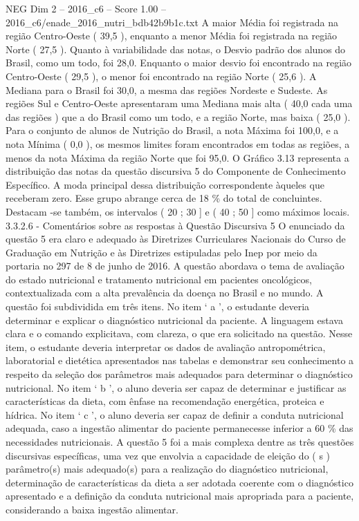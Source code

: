\begin{textsample}{NEG Dim 2 – 2016\_c6 – Score 1.00 – 2016\_c6/enade\_2016\_nutri\_bdb42b9b1c.txt}
A maior Média foi registrada na região Centro-Oeste ( 39,5 ), enquanto a menor Média foi registrada na região Norte ( 27,5 ).
Quanto à variabilidade das notas, o Desvio padrão dos alunos do Brasil, como um todo, foi 28,0.
Enquanto o maior desvio foi encontrado na região Centro-Oeste ( 29,5 ), o menor foi encontrado na região Norte ( 25,6 ).
A Mediana para o Brasil foi 30,0, a mesma das regiões Nordeste e Sudeste.
As regiões Sul e Centro-Oeste apresentaram uma Mediana mais alta ( 40,0 cada uma das regiões ) que a do Brasil como um todo, e a região Norte, mas baixa ( 25,0 ).
Para o conjunto de alunos de Nutrição do Brasil, a nota Máxima foi 100,0, e a nota Mínima ( 0,0 ), os mesmos limites foram encontrados em todas as regiões, a menos da nota Máxima da região Norte que foi 95,0.
O Gráfico 3.13 representa a distribuição das notas da questão discursiva 5 do Componente de Conhecimento Específico.
A moda principal dessa distribuição correspondente àqueles que receberam zero.
Esse grupo abrange cerca de 18 \% do total de concluintes.
Destacam -se também, os intervalos ( 20 ; 30 ] e ( 40 ; 50 ] como máximos locais. 3.3.2.6 - Comentários sobre as respostas à Questão Discursiva 5 O enunciado da questão 5 era claro e adequado às Diretrizes Curriculares Nacionais do Curso de Graduação em Nutrição e às Diretrizes estipuladas pelo Inep por meio da portaria no 297 de 8 de junho de 2016.
A questão abordava o tema de avaliação do estado nutricional e tratamento nutricional em pacientes oncológicos, contextualizada com a alta prevalência da doença no Brasil e no mundo.
A questão foi subdividida em três itens.
No item ‘ a ’, o estudante deveria determinar e explicar o diagnóstico nutricional da paciente.
A linguagem estava clara e o comando explicitava, com clareza, o que era solicitado na questão.
Nesse item, o estudante deveria interpretar os dados de avaliação antropométrica, laboratorial e dietética apresentados nas tabelas e demonstrar seu conhecimento a respeito da seleção dos parâmetros mais adequados para determinar o diagnóstico nutricional.
No item ‘ b ’, o aluno deveria ser capaz de determinar e justificar as características da dieta, com ênfase na recomendação energética, proteica e hídrica.
No item ‘ c ’, o aluno deveria ser capaz de definir a conduta nutricional adequada, caso a ingestão alimentar do paciente permanecesse inferior a 60 \% das necessidades nutricionais.
A questão 5 foi a mais complexa dentre as três questões discursivas específicas, uma vez que envolvia a capacidade de eleição do ( s ) parâmetro(s) mais adequado(s) para a realização do diagnóstico nutricional, determinação de características da dieta a ser adotada coerente com o diagnóstico apresentado e a definição da conduta nutricional mais apropriada para a paciente, considerando a baixa ingestão alimentar.

\end{textsample}
